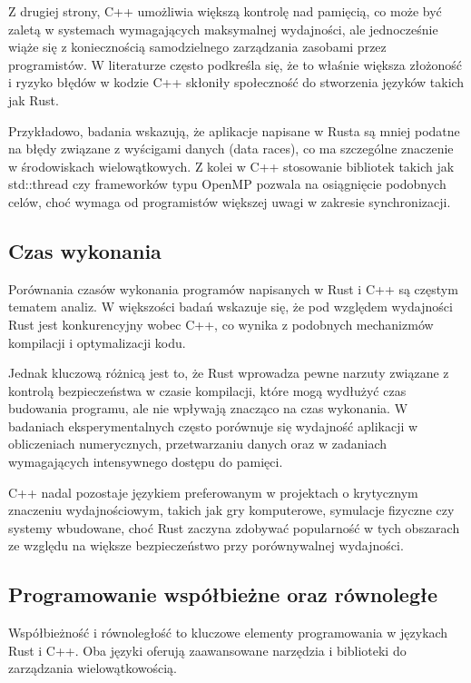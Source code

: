 Z drugiej strony, C++ umożliwia większą kontrolę nad pamięcią, co może być zaletą w systemach wymagających maksymalnej wydajności, ale jednocześnie wiąże się z koniecznością samodzielnego zarządzania zasobami przez programistów. W literaturze często podkreśla się, że to właśnie większa złożoność i ryzyko błędów w kodzie C++ skłoniły społeczność do stworzenia języków takich jak Rust.

Przykładowo, badania wskazują, że aplikacje napisane w Rusta są mniej podatne na błędy związane z wyścigami danych (data races), co ma szczególne znaczenie w środowiskach wielowątkowych. Z kolei w C++ stosowanie bibliotek takich jak std::thread czy frameworków typu OpenMP pozwala na osiągnięcie podobnych celów, choć wymaga od programistów większej uwagi w zakresie synchronizacji. \cite{RustSafety1, RustSafety2, RustSafety3}

\subsection{Czas wykonania}
Porównania czasów wykonania programów napisanych w Rust i C++ są częstym tematem analiz. W większości badań wskazuje się, że pod względem wydajności Rust jest konkurencyjny wobec C++, co wynika z podobnych mechanizmów kompilacji i optymalizacji kodu.

Jednak kluczową różnicą jest to, że Rust wprowadza pewne narzuty związane z kontrolą bezpieczeństwa w czasie kompilacji, które mogą wydłużyć czas budowania programu, ale nie wpływają znacząco na czas wykonania. W badaniach eksperymentalnych często porównuje się wydajność aplikacji w obliczeniach numerycznych, przetwarzaniu danych oraz w zadaniach wymagających intensywnego dostępu do pamięci.

C++ nadal pozostaje językiem preferowanym w projektach o krytycznym znaczeniu wydajnościowym, takich jak gry komputerowe, symulacje fizyczne czy systemy wbudowane, choć Rust zaczyna zdobywać popularność w tych obszarach ze względu na większe bezpieczeństwo przy porównywalnej wydajności. \cite{RustPerformance1, RustPerformance2, RustPerformance3, RustPerformance4}

\subsection{Programowanie współbieżne oraz równoległe}
Współbieżność i równoległość to kluczowe elementy programowania w  językach Rust i C++. Oba języki oferują zaawansowane narzędzia i biblioteki do zarządzania wielowątkowością.

